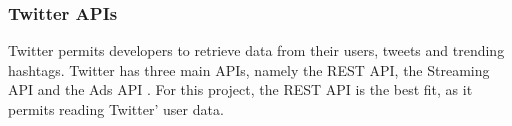 % 
% 
% 

\subsubsection{Twitter \acp{API}} \label{sub:twitterapi}
Twitter permits developers to retrieve data from their users, tweets and
trending hashtags. Twitter has three main \acp{API}, namely the \ac{REST}
\ac{API}, the Streaming \ac{API} and the Ads \ac{API} \citep{TwitterDevDocs}.
For this project, the \ac{REST} \ac{API} is the best fit, as it permits reading
Twitter' user data.

